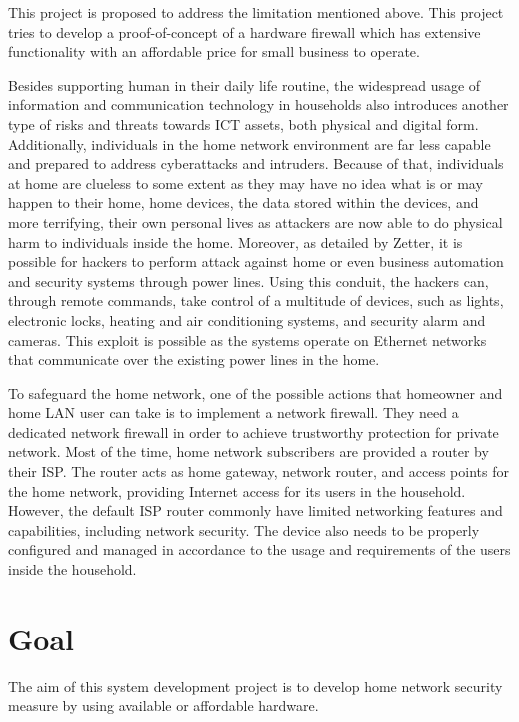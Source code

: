 \documentclass[../index.tex]{subfiles}
\begin{document}
This project is proposed to address the limitation mentioned above. This project tries to develop a
proof-of-concept of a hardware firewall which has extensive functionality with an affordable price
for small business to operate.

Besides supporting human in their daily life routine, the widespread usage of information and
communication technology in households also introduces another type of risks and threats towards ICT
assets, both physical and digital form. Additionally, individuals in the home network environment
are far less capable and prepared to address cyberattacks and intruders. Because of that,
individuals at home are clueless to some extent as they may have no idea what is or may happen to
their home, home devices, the data stored within the devices, and more terrifying, their own
personal lives as attackers are now able to do physical harm to individuals inside the home.
Moreover, as detailed by Zetter, it is possible for hackers to perform attack against home or even
business automation and security systems through power lines. Using this conduit, the hackers can,
through remote commands, take control of a multitude of devices, such as lights, electronic locks,
heating and air conditioning systems, and security alarm and cameras. This exploit is possible as
the systems operate on Ethernet networks that communicate over the existing power lines in the home.

To safeguard the home network, one of the possible actions that homeowner and home LAN user can take
is to implement a network firewall. They need a dedicated network firewall in order to achieve
trustworthy protection for private network. Most of the time, home network subscribers are provided
a router by their ISP. The router acts as home gateway, network router, and access points for the
home network, providing Internet access for its users in the household. However, the default ISP
router commonly have limited networking features and capabilities, including network security. The
device also needs to be properly configured and managed in accordance to the usage and requirements
of the users inside the household.

\section{Goal}

The aim of this system development project is to develop home network security measure by using
available or affordable hardware.
\end{document}
